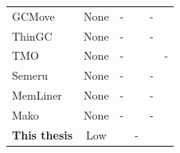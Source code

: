 \begin{table}[t]
{\begin{tabular}{lccccc}
			GCMove~\cite{gcmove}                                                                          & None & -             & \checkmark     & -                          & \checkmark                \\
			ThinGC~\cite{thingc}                                                                          & None & -             & \checkmark     & -                          & \checkmark                \\
			TMO~\cite{weiner:tmo}                                                                         & None & -             & \checkmark     & \checkmark                 & -                         \\
			Semeru~\cite{wang:semeru}                                                                     & None & -             & \checkmark     & -                          & \checkmark                \\
			MemLiner~\cite{wang:memliner}                                                                 & None & -             & \checkmark     & -                          & \checkmark                \\
			Mako~\cite{ma:mako}                                                                           & None & -             & \checkmark     & -                          & \checkmark                \\ \hline
			\textbf{This thesis}                                                                          & Low  & \checkmark    & -              & \checkmark                 & \checkmark                \\ \hline
		\end{tabular}%
	}
	\label{tab:related}
\end{table}

